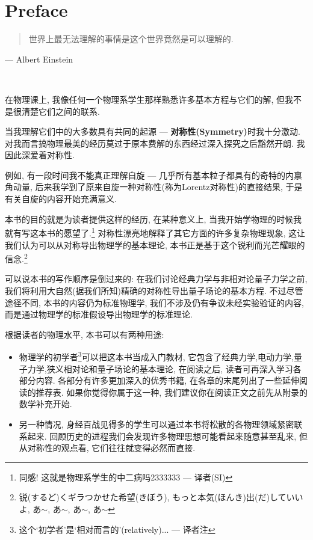 
\chapter*{Preface}

\begin{quote}
世界上最无法理解的事情是这个世界竟然是可以理解的.
\end{quote}
--- Albert Einstein

\ 

在物理课上, 我像任何一个物理系学生那样熟悉许多基本方程与它们的解, 但我不是很清楚它们之间的联系.

当我理解它们中的大多数具有共同的起源 --- \textbf{对称性(Symmetry)}时我十分激动. 对我而言搞物理最美的经历莫过于原本费解的东西经过深入探究之后豁然开朗. 我因此深爱着对称性.

例如, 有一段时间我不能真正理解自旋 --- 几乎所有基本粒子都具有的奇特的内禀角动量, 后来我学到了原来自旋一种对称性(称为Lorentz对称性)的直接结果, 于是有关自旋的内容开始充满意义.

本书的目的就是为读者提供这样的经历, 在某种意义上, 当我开始学物理的时候我就有写这本书的愿望了.\footnote{同感! 这就是物理系学生的中二病吗2333333 --- 译者(SI)} 对称性漂亮地解释了其它方面的许多复杂物理现象, 这让我们认为可以从对称导出物理学的基本理论, 本书正是基于这个锐利而光芒耀眼的信念.\footnote{锐(するど)くギラつかせた希望(きぼう), もっと本気(ほんき)出(だ)していいよ, あ$\sim$, あ$\sim$, あ$\sim$, あ$\sim$}

可以说本书的写作顺序是倒过来的: 在我们讨论经典力学与非相对论量子力学之前, 我们将利用大自然(据我们所知)精确的对称性导出量子场论的基本方程. 不过尽管途径不同, 本书的内容仍为标准物理学, 我们不涉及仍有争议未经实验验证的内容, 而是通过物理学的标准假设导出物理学的标准理论.

根据读者的物理水平, 本书可以有两种用途:
\begin{itemize}
	\item 物理学的初学者\footnote{这个`初学者'是`相对而言的'(relatively)... --- 译者注}可以把这本书当成入门教材, 它包含了经典力学,电动力学,量子力学,狭义相对论和量子场论的基本理论, 在阅读之后, 读者可再深入学习各部分内容. 各部分有许多更加深入的优秀书籍, 在各章的末尾列出了一些延伸阅读的推荐表. 如果你觉得你属于这一种, 我们建议你在阅读正文之前先从附录的数学补充开始.
	\item 
	另一种情况, 身经百战见得多的学生可以通过本书将松散的各物理领域紧密联系起来. 回顾历史的进程我们会发现许多物理思想可能看起来随意甚至乱来, 但从对称性的观点看, 它们往往就变得必然而直接.
\end{itemize}

